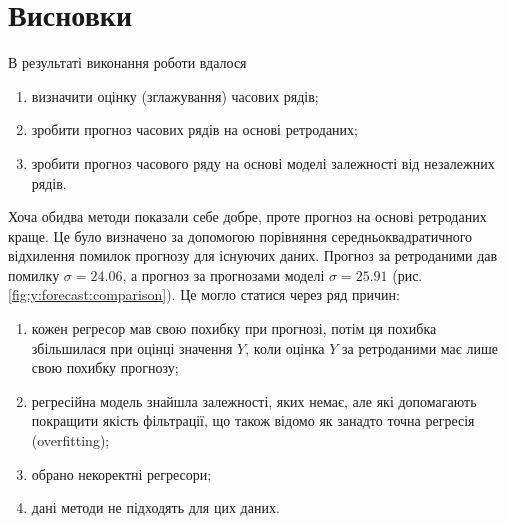 \chapter*{Висновки}

В результаті виконання роботи вдалося
\begin{enumerate}
  \item визначити оцінку (зглажування) часових рядів;
  \item зробити прогноз часових рядів на основі ретроданих;
  \item зробити прогноз часового ряду на основі моделі залежності
    від незалежних рядів.
\end{enumerate}

Хоча обидва методи показали себе добре,
проте прогноз на основі ретроданих краще.
Це було визначено за допомогою порівняння середньоквадратичного відхилення
помилок прогнозу для існуючих даних.
Прогноз за ретроданими дав помилку $\sigma = 24.06$,
а прогноз за прогнозами моделі $\sigma = 25.91$
(рис. \ref{fig:y:forecast:comparison}).
Це могло статися через ряд причин:
\begin{enumerate}
  \item кожен регресор мав свою похибку при прогнозі,
    потім ця похибка збільшилася при оцінці значення $Y$,
    коли оцінка $Y$ за ретроданими має лише свою похибку прогнозу;
  \item регресійна модель знайшла залежності, яких немає,
    але які допомагають покращити якість фільтрації,
    що також відомо як занадто точна регресія (overfitting);
    \cite{overfitting}
  \item обрано некоректні регресори;
  \item дані методи не підходять для цих даних.
\end{enumerate}

